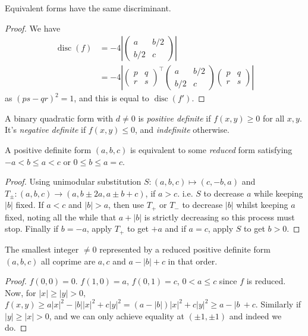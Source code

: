 \documentclass[a4paper, 10pt]{amsart}
\begin{document}
\begin{theorem}
    Equivalent forms have the same discriminant.
\end{theorem}
\begin{proof}
We have
\begin{align*}
    \operatorname{disc}(f) &= -4\left| \begin{pmatrix}
        a & b/2 \\ b/2 & c
    \end{pmatrix}\right|\\ &= -4 \left|\begin{pmatrix}
        p & q \\ r & s
    \end{pmatrix}^{\intercal} \begin{pmatrix}
        a & b/2 \\ b/2 & c
    \end{pmatrix} \begin{pmatrix}
        p & q \\ r & s
    \end{pmatrix}\right|
\end{align*}
as $(ps - qr)^2 = 1$, and this is equal to $\operatorname{disc}(f')$.
\end{proof}

\begin{definition}
    A binary quadratic form with $d \neq 0$ is \emph{positive definite} if $f(x, y) \geq 0$ for all $x, y$.
    It's \emph{negative definite} if $f(x, y) \leq 0$, and \emph{indefinite} otherwise. 
\end{definition}

\begin{theorem}
    A positive definite form $(a, b, c)$ is equivalent to some \emph{reduced} form satisfying $-a < b \leq a < c$ or $0 \leq b \leq a = c$.
\end{theorem}
\begin{proof}
    Using unimodular substitution $S: (a, b, c) \mapsto (c, -b, a)$ and $T_{\pm}: (a, b, c) \rightarrow (a, b \pm 2a, a \pm b + c)$, if $a > c$. i.e. $S$ to decrease $a$ while keeping $|b|$ fixed. If $a < c$ and $|b| > a$, then use $T_+$ or $T_-$ to decrease $|b|$ whilst keeping $a$ fixed, noting all the while that $a + |b|$ is strictly decreasing so this process must stop. Finally if $b = -a$, apply $T_+$ to get $+a$ and if $a = c$, apply $S$ to get $b > 0$.
\end{proof}

\begin{theorem}
    The smallest integer $\neq 0$ represented by a reduced positive definite form $(a, b, c)$ all coprime are $a, c$ and $a - |b| + c$ in that order.
\end{theorem}
\begin{proof}
    $f(0, 0) = 0$. $f(1, 0) = a$, $f(0, 1)= c$, $0 < a \leq c$ since $f$ is reduced. Now, for $|x| \geq |y| > 0$, $f(x, y) \geq a|x|^2 - |b||x|^2 + c|y|^2 = (a - |b|)|x|^2 + c|y|^2 \geq a - |b\ + c$. Similarly if $|y| \geq |x| > 0$, and we can only achieve equality at $(\pm 1, \pm 1)$ and indeed we do.
\end{proof}
\end{document}
